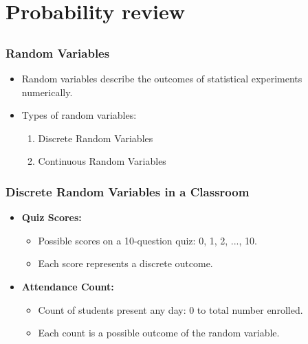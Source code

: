 \documentclass[aspectratio=169]{beamer}
\begin{document}
\section{Probability review} 
\subsection{}
\begin{frame}
\frametitle{\textbf{Random Variables}}
\begin{itemize}
    \item [$\bullet$] Random variables describe the outcomes of statistical experiments numerically.
    \item [$\bullet$] Types of random variables:
    \begin{enumerate}
        \item Discrete Random Variables
        \item Continuous Random Variables
    \end{enumerate}
\end{itemize}
\end{frame}


\begin{frame}
\frametitle{\textbf{Discrete Random Variables in a Classroom}}
\begin{itemize}
    \item [$\bullet$] \textbf{Quiz Scores:}
    \begin{itemize}
        \item [$-$]  Possible scores on a 10-question quiz: 0, 1, 2, ..., 10.
        \item [$-$]  Each score represents a discrete outcome.
    \end{itemize}
    \item [$\bullet$] \textbf{Attendance Count:}
    \begin{itemize}
        \item [$-$] Count of students present any day: 0 to total number enrolled.
        \item [$-$] Each count is a possible outcome of the random variable.
    \end{itemize}
\end{itemize}
\end{frame}
\end{document}
